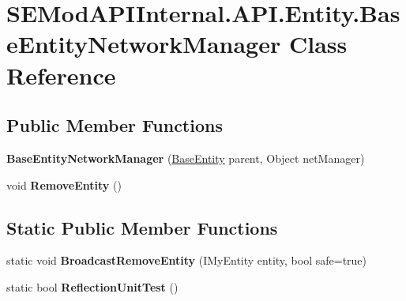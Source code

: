 \hypertarget{class_s_e_mod_a_p_i_internal_1_1_a_p_i_1_1_entity_1_1_base_entity_network_manager}{}\section{S\+E\+Mod\+A\+P\+I\+Internal.\+A\+P\+I.\+Entity.\+Base\+Entity\+Network\+Manager Class Reference}
\label{class_s_e_mod_a_p_i_internal_1_1_a_p_i_1_1_entity_1_1_base_entity_network_manager}
\subsection*{Public Member Functions}
\begin{DoxyCompactItemize}
\item 
\hypertarget{class_s_e_mod_a_p_i_internal_1_1_a_p_i_1_1_entity_1_1_base_entity_network_manager_a50daf2fc18258ec2fd02df4ef2b5d5ea}{}{\bfseries Base\+Entity\+Network\+Manager} (\hyperlink{class_s_e_mod_a_p_i_internal_1_1_a_p_i_1_1_entity_1_1_base_entity}{Base\+Entity} parent, Object net\+Manager)\label{class_s_e_mod_a_p_i_internal_1_1_a_p_i_1_1_entity_1_1_base_entity_network_manager_a50daf2fc18258ec2fd02df4ef2b5d5ea}

\item 
\hypertarget{class_s_e_mod_a_p_i_internal_1_1_a_p_i_1_1_entity_1_1_base_entity_network_manager_a10c1106ed35bd0bf0ca9d8b9ed79162a}{}void {\bfseries Remove\+Entity} ()\label{class_s_e_mod_a_p_i_internal_1_1_a_p_i_1_1_entity_1_1_base_entity_network_manager_a10c1106ed35bd0bf0ca9d8b9ed79162a}

\end{DoxyCompactItemize}
\subsection*{Static Public Member Functions}
\begin{DoxyCompactItemize}
\item 
\hypertarget{class_s_e_mod_a_p_i_internal_1_1_a_p_i_1_1_entity_1_1_base_entity_network_manager_a9c86e450f5ed53a6c31a51ef2eba27e0}{}static void {\bfseries Broadcast\+Remove\+Entity} (I\+My\+Entity entity, bool safe=true)\label{class_s_e_mod_a_p_i_internal_1_1_a_p_i_1_1_entity_1_1_base_entity_network_manager_a9c86e450f5ed53a6c31a51ef2eba27e0}

\item 
\hypertarget{class_s_e_mod_a_p_i_internal_1_1_a_p_i_1_1_entity_1_1_base_entity_network_manager_a88f32ce38e85b934b1d44a73680c2562}{}static bool {\bfseries Reflection\+Unit\+Test} ()\label{class_s_e_mod_a_p_i_internal_1_1_a_p_i_1_1_entity_1_1_base_entity_network_manager_a88f32ce38e85b934b1d44a73680c2562}

\end{DoxyCompactItemize}
